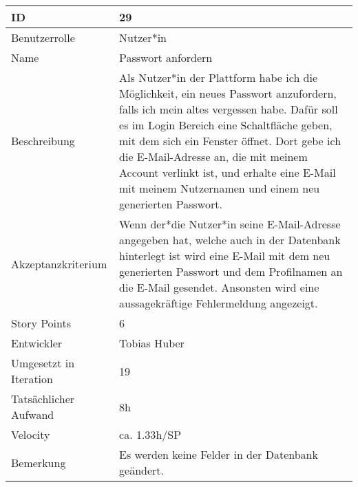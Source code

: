 \begin{tabularx}{\textwidth}{|p{}|X|}
	\hline
	ID & 29 \\
	\hline
	Benutzerrolle & Nutzer*in \\
	\hline
	Name & Passwort anfordern\\
	\hline
	Beschreibung & Als Nutzer*in der Plattform habe ich die Möglichkeit, ein neues Passwort anzufordern, falls ich mein altes vergessen habe. Dafür soll es im Login Bereich eine Schaltfläche geben, mit dem sich ein Fenster öffnet. Dort gebe ich die E-Mail-Adresse an, die mit meinem Account verlinkt ist, und erhalte eine E-Mail mit meinem Nutzernamen und einem neu generierten Passwort. \\
	\hline
	Akzeptanzkriterium & Wenn der*die Nutzer*in seine E-Mail-Adresse angegeben hat, welche auch in der Datenbank hinterlegt ist wird eine E-Mail mit dem neu generierten Passwort und dem Profilnamen an die E-Mail gesendet. Ansonsten wird eine aussagekräftige Fehlermeldung angezeigt. \\
	\hline
	Story Points & 6\\
	\hline
	Entwickler & Tobias Huber\\
	\hline
	Umgesetzt in Iteration & 19\\
	\hline
	Tatsächlicher Aufwand & 8h\\
	\hline
	Velocity & ca. 1.33h/SP\\
	\hline
	Bemerkung & Es werden keine Felder in der Datenbank geändert.\\
	\hline
\end{tabularx}
\vspace{20pt}
